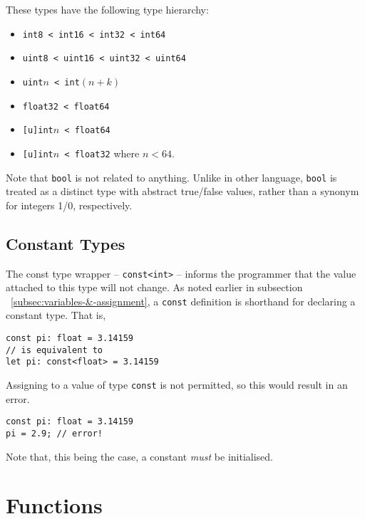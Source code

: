 \documentclass{article}
\begin{document}

    These types have the following type hierarchy:
    \begin{itemize}
        \item \texttt{int8 < int16 < int32 < int64}
        \item \texttt{uint8 < uint16 < uint32 < uint64}
        \item \texttt{uint\(n\) < int\((n+k)\)}
        \item \texttt{float32 < float64}
        \item \texttt{[u]int\(n\) < float64}
        \item \texttt{[u]int\(n\) < float32} where \(n < 64\).
    \end{itemize}

    Note that \texttt{bool} is not related to anything.
    Unlike in other language, \texttt{bool} is treated as a distinct type with abstract true/false values, rather than a synonym for integers 1/0, respectively.

    \subsection{Constant Types}\label{subsec:constant-types}

    The const type wrapper -- \texttt{const<int>} -- informs the programmer that the value attached to this type will not change.
    As noted earlier in subsection ~\ref{subsec:variables-&-assignment}, a \texttt{const} definition is shorthand for declaring a constant type.
    That is,

    \begin{lstlisting}[language=CustomLang]
const pi: float = 3.14159
// is equivalent to
let pi: const<float> = 3.14159
    \end{lstlisting}

    Assigning to a value of type \texttt{const} is not permitted, so this would result in an error.

    \begin{lstlisting}[language=CustomLang]
const pi: float = 3.14159
pi = 2.9; // error!
    \end{lstlisting}

    Note that, this being the case, a constant \textit{must} be initialised.

    \section{Functions}
\end{document}
